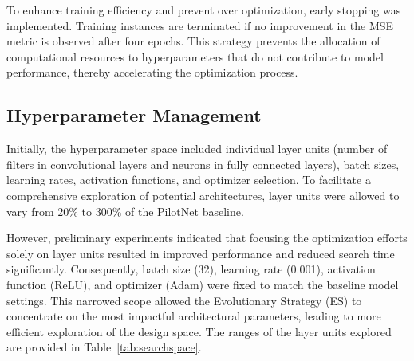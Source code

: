 \documentclass[conference]{IEEEtran}
\begin{document}
To enhance training efficiency and prevent over optimization, early stopping was implemented. Training instances are terminated if no improvement in the MSE metric is observed after four epochs. This strategy prevents the allocation of computational resources to hyperparameters that do not contribute to model performance, thereby accelerating the optimization process.

\subsection{Hyperparameter Management}

Initially, the hyperparameter space included individual layer units (number of filters in convolutional layers and neurons in fully connected layers), batch sizes, learning rates, activation functions, and optimizer selection. To facilitate a comprehensive exploration of potential architectures, layer units were allowed to vary from 20\% to 300\% of the PilotNet baseline.

However, preliminary experiments indicated that focusing the optimization efforts solely on layer units resulted in improved performance and reduced search time significantly. Consequently, batch size (32), learning rate (0.001), activation function (ReLU), and optimizer (Adam) were fixed to match the baseline model settings. This narrowed scope allowed the Evolutionary Strategy (ES) to concentrate on the most impactful architectural parameters, leading to more efficient exploration of the design space. The ranges of the layer units explored are provided in Table~\ref{tab:searchspace}.

\end{document}

